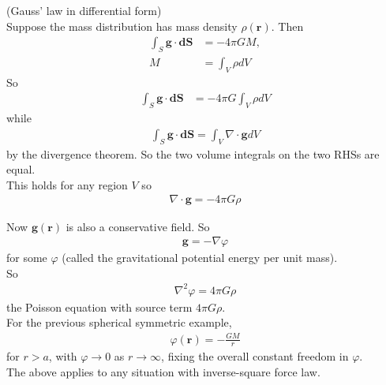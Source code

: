 \documentclass[a4paper]{article}
\begin{document}
\begin{thm} (Gauss' law in differential form)\\
Suppose the mass distribution has mass density $\rho\left(\mathbf{r}\right)$. Then
\begin{equation*}
\begin{aligned}
\int_S \mathbf{g}\cdot\mathbf{dS} &= -4 \pi GM,\\
M &= \int_V \rho dV
\end{aligned}
\end{equation*}
So
\begin{equation*}
\begin{aligned}
\int_S \mathbf{g}\cdot\mathbf{dS} &= -4\pi G\int_V \rho dV
\end{aligned}
\end{equation*}
while
\begin{equation*}
\begin{aligned}
\int_S \mathbf{g}\cdot\mathbf{dS} = \int_V \nabla\cdot\mathbf{g} dV
\end{aligned}
\end{equation*}
by the divergence theorem. So the two volume integrals on the two RHSs are equal.\\
This holds for any region $V$ so
\begin{equation*}
\begin{aligned}
\nabla\cdot\mathbf{g} = -4\pi G\rho
\end{aligned}
\end{equation*}
\end{thm}
Now $\mathbf{g}\left(\mathbf{r}\right)$ is also a conservative field. So
\begin{equation*}
\begin{aligned}
\mathbf{g} = -\nabla\varphi
\end{aligned}
\end{equation*}
for some $\varphi$ (called the gravitational potential energy per unit mass).\\
So
\begin{equation*}
\begin{aligned}
\nabla^2 \varphi = 4\pi G\rho
\end{aligned}
\end{equation*}
the Poisson equation with source term $4\pi G\rho$.\\
For the previous spherical symmetric example,
\begin{equation*}
\begin{aligned}
\varphi\left(\mathbf{r}\right)=-\frac{GM}{r}
\end{aligned}
\end{equation*}
for $r>a$, with $\varphi \to 0$ as $r\to\infty$, fixing the overall constant freedom in $\varphi$.\\
The above applies to any situation with inverse-square force law.
\end{document}
